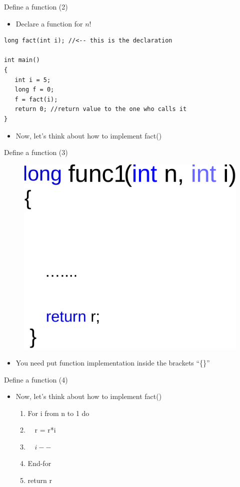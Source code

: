 \begin{frame}[fragile]{Define a function (2)}
\begin{itemize}
	\item {Declare a function for $n!$}
\end{itemize}
\begin{lstlisting}
long fact(int i); //<-- this is the declaration

int main()
{
   int i = 5;
   long f = 0;
   f = fact(i);
   return 0; //return value to the one who calls it
}
\end{lstlisting}
\vspace{-0.15in}
\begin{itemize}
	\item {Now, let's think about how to implement fact()}
\end{itemize}

\end{frame}

\begin{frame}{Define a function (3)}
	\begin{figure}
		\includegraphics[width=0.35\linewidth]{figs/func_declar3.pdf}
	\end{figure}
	\begin{itemize}
		\item {You need put function implementation inside the brackets ``\{\}''}
	\end{itemize}
\end{frame}

\begin{frame}[fragile]{Define a function (4)}
\begin{itemize}
	\item {Now, let's think about how to implement fact()}
	\begin{enumerate}
		\item {For i from n to 1 do}
		\item {~~r = r*i}
		\item {~~$i--$}
		\item {End-for}
		\item {return r}
	\end{enumerate}
\end{itemize}

\end{frame}

